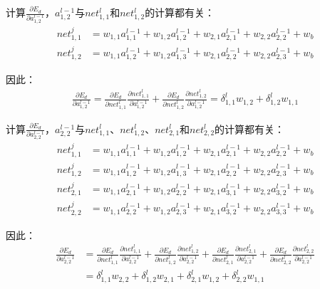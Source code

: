 \begin{example}
	计算\(\frac{\partial{E_d}}{\partial{a^{l-1}_{1,2}}}\)，\(a^{l-1}_{1,2}\)与\(net^l_{1,1}\)和\(net^l_{1,2}\)的计算都有关：
	\begin{align*}
		net^j_{1,1} & =w_{1,1}a^{l-1}_{1,1}+w_{1,2}a^{l-1}_{1,2}+w_{2,1}a^{l-1}_{2,1}+w_{2,2}a^{l-1}_{2,2}+w_b \\
		net^j_{1,2} & =w_{1,1}a^{l-1}_{1,2}+w_{1,2}a^{l-1}_{1,3}+w_{2,1}a^{l-1}_{2,2}+w_{2,2}a^{l-1}_{2,3}+w_b
	\end{align*}
\end{example}

因此：
\begin{align*}
	\frac{\partial{E_d}}{\partial{a^{l-1}_{1,2}}}=\frac{\partial{E_d}}{\partial{net^{l}_{1,1}}}\frac{\partial{net^{l}_{1,1}}}{\partial{a^{l-1}_{1,2}}}+\frac{\partial{E_d}}{\partial{net^{l}_{1,2}}}\frac{\partial{net^{l}_{1,2}}}{\partial{a^{l-1}_{1,2}}}=\delta^l_{1,1}w_{1,2}+\delta^l_{1,2}w_{1,1}
\end{align*}

\begin{example}
	计算\(\frac{\partial{E_d}}{\partial{a^{l-1}_{2,2}}}\)，\(a^{l-1}_{2,2}\)与\(net^l_{1,1}\)、\(net^l_{1,2}\)、\(net^l_{2,1}\)和\(net^l_{2,2}\)的计算都有关：
	\begin{align*}
		net^j_{1,1} & =w_{1,1}a^{l-1}_{1,1}+w_{1,2}a^{l-1}_{1,2}+w_{2,1}a^{l-1}_{2,1}+w_{2,2}a^{l-1}_{2,2}+w_b \\
		net^j_{1,2} & =w_{1,1}a^{l-1}_{1,2}+w_{1,2}a^{l-1}_{1,3}+w_{2,1}a^{l-1}_{2,2}+w_{2,2}a^{l-1}_{2,3}+w_b \\
		net^j_{2,1} & =w_{1,1}a^{l-1}_{2,1}+w_{1,2}a^{l-1}_{2,2}+w_{2,1}a^{l-1}_{3,1}+w_{2,2}a^{l-1}_{3,2}+w_b \\
		net^j_{2,2} & =w_{1,1}a^{l-1}_{2,2}+w_{1,2}a^{l-1}_{2,3}+w_{2,1}a^{l-1}_{3,2}+w_{2,2}a^{l-1}_{3,3}+w_b
	\end{align*}
\end{example}


因此：
\begin{align*}
	\frac{\partial{E_d}}{\partial{a^{l-1}_{2,2}}} & =\frac{\partial{E_d}}{\partial{net^{l}_{1,1}}}\frac{\partial{net^{l}_{1,1}}}{\partial{a^{l-1}_{2,2}}}+\frac{\partial{E_d}}{\partial{net^{l}_{1,2}}}\frac{\partial{net^{l}_{1,2}}}{\partial{a^{l-1}_{2,2}}}+\frac{\partial{E_d}}{\partial{net^{l}_{2,1}}}\frac{\partial{net^{l}_{2,1}}}{\partial{a^{l-1}_{2,2}}}+\frac{\partial{E_d}}{\partial{net^{l}_{2,2}}}\frac{\partial{net^{l}_{2,2}}}{\partial{a^{l-1}_{2,2}}} \\
	                                              & =\delta^l_{1,1}w_{2,2}+\delta^l_{1,2}w_{2,1}+\delta^l_{2,1}w_{1,2}+\delta^l_{2,2}w_{1,1}
\end{align*}


